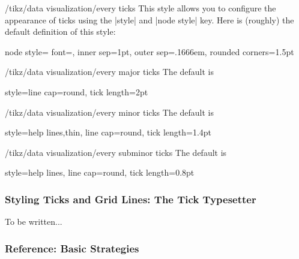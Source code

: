 \begin{stylekey}{/tikz/data visualization/every ticks}
  This style allows you to configure the appearance of ticks using the
  |style| and |node style| key. Here is (roughly) the default
  definition of this style:
\begin{codeexample}[]
node style={
  font=\footnotesize,
  inner sep=1pt,
  outer sep=.1666em,
  rounded corners=1.5pt
}    
\end{codeexample}
\end{stylekey}

\begin{stylekey}{/tikz/data visualization/every major ticks}
  The default is
\begin{codeexample}[]
  style={line cap=round}, tick length=2pt
\end{codeexample}
\end{stylekey}

\begin{stylekey}{/tikz/data visualization/every minor ticks}
  The default is
\begin{codeexample}[]
  style={help lines,thin, line cap=round}, tick length=1.4pt
\end{codeexample}
\end{stylekey}

\begin{stylekey}{/tikz/data visualization/every subminor ticks}
  The default is
\begin{codeexample}[]
  style={help lines, line cap=round}, tick length=0.8pt
\end{codeexample}
\end{stylekey}



\subsubsection{Styling Ticks and Grid Lines: The Tick Typesetter}
\label{section-dv-tick-labels}


To be written...

\subsubsection{Reference: Basic Strategies}

\label{section-dv-strategies}

